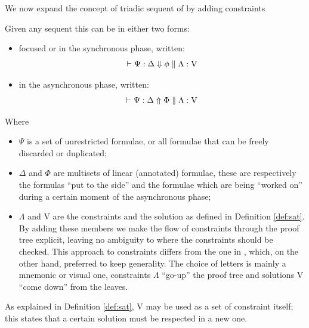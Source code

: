 \documentclass[a4paper, 12pt, english]{report}
\begin{document}
We now expand the concept of triadic sequent of \cite{Focusing} by adding constraints
\begin{define}
	Given any sequent this can be in either two forms:
	\begin{itemize}
		\item focused or in the synchronous phase, written:
			$$\vdash \Psi : \Delta \Downarrow \phi \; \Vert \; \Lambda : \text{V}$$
		\item in the asynchronous phase, written:
			$$\vdash \Psi : \Delta \Uparrow \Phi \; \Vert \; \Lambda : \text{V}$$
	\end{itemize}
	Where 
	\begin{itemize}
		\item $\Psi$ is a set of unrestricted formulae, or all formulae that can be freely discarded or duplicated;
		\item $\Delta$ and $\Phi$ are multisets of linear (annotated) formulae, these are respectively the formulas ``put to the side'' and the formulae which are being ``worked on'' during a certain moment of the asynchronous phase;
		\item $\Lambda$ and V are the constraints and the solution as defined in Definition \ref{def:sat}.
			By adding these members we make the flow of constraints through the proof tree explicit, leaving no ambiguity to where the constraints should be checked.
			This approach to constraints differs from the one in \cite{HarlandPym}, which, on the other hand, preferred to keep generality.
			The choice of letters is mainly a mnemonic or visual one, constraints $\Lambda$ ``go-up'' the proof tree and solutions V ``come down'' from the leaves.
	\end{itemize}
\end{define}
As explained in Definition \ref{def:sat}, V may be used as a set of constraint itself; this states that a certain solution must be respected in a new one.
\end{document}
